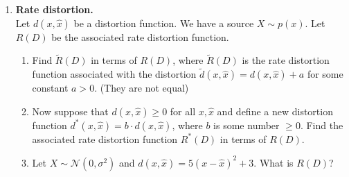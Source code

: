 \documentclass[12pt]{article}
\begin{document}
\begin{enumerate}
\begin{problem}
    \newpage
\end{problem}
\begin{solution}
\vskip .3in
\end{solution}
\item {\bf Rate distortion.}\\
Let $d(x, \hat{x})$ be a distortion function. We have a source $X \sim p(x)$. Let $R(D)$ be the associated rate distortion function.
\begin{enumerate}
\item Find $\tilde{R}(D)$ in terms of $R(D)$, where $\tilde{R}(D)$ is the rate distortion function associated with the distortion $\tilde{d}(x, \hat{x}) = d(x, \hat{x}) + a$ for some constant $a > 0$. (They are not equal)
\item Now suppose that $d(x, \hat{x}) \geq 0$ for all $x, \hat{x}$ and define a new distortion function $d^*(x, \hat{x}) = b\cdot d(x, \hat{x})$, where $b$ is some number $\geq 0$. Find the associated rate distortion function $R^*(D)$ in terms of $R(D)$.
\item Let $X \sim \mathcal{N}(0, \sigma^2)$ and $d(x, \hat{x}) = 5(x - \hat{x})^2 + 3$. What is $R(D)$?
\end{enumerate}


\end{enumerate}
\end{document}
